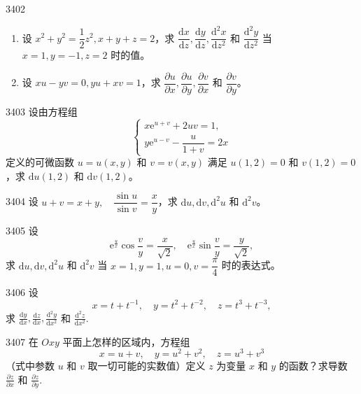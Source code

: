 \begin{prob}[M]{3402}
\begin{enumerate}[label=(\alph*), itemsep=2pt, topsep=3pt]
  \item 设 $x^2 + y^2 = \dfrac{1}{2}z^2, x + y + z = 2$，求 $\dfrac{\mathrm{d}x}{\mathrm{d}z}, \dfrac{\mathrm{d}y}{\mathrm{d}z}, \dfrac{\mathrm{d}^2 x}{\mathrm{d}z^2}$ 和 $\dfrac{\mathrm{d}^2 y}{\mathrm{d}z^2}$ 当 $x = 1, y = -1, z = 2$ 时的值。
  \item 设 $xu - yv = 0, yu + xv = 1$，求 $\dfrac{\partial u}{\partial x}, \dfrac{\partial u}{\partial y}, \dfrac{\partial v}{\partial x}$ 和 $\dfrac{\partial v}{\partial y}$。
\end{enumerate}
\end{prob}

\begin{prob}[M]{3403}
设由方程组
\[
\begin{cases}
x\mathrm{e}^{u + v} + 2uv = 1, \\
y\mathrm{e}^{u - v} - \dfrac{u}{1 + v} = 2x
\end{cases}
\]
定义的可微函数 $u = u(x, y)$ 和 $v = v(x, y)$ 满足 $u(1, 2) = 0$ 和 $v(1, 2) = 0$，求 $\mathrm{d}u(1, 2)$ 和 $\mathrm{d}v(1, 2)$。
\end{prob}

\begin{prob}[S]{3404}
设 $u + v = x + y,\quad \dfrac{\sin u}{\sin v} = \dfrac{x}{y}$，求 $\mathrm{d}u, \mathrm{d}v, \mathrm{d}^2 u$ 和 $\mathrm{d}^2 v$。
\end{prob}

\begin{prob}[M]{3405}
设
\[
\mathrm{e}^{\frac{u}{x}}\cos\frac{v}{y} = \frac{x}{\sqrt{2}}, \quad \mathrm{e}^{\frac{u}{x}}\sin\frac{v}{y} = \frac{y}{\sqrt{2}},
\]
求 $\mathrm{d}u, \mathrm{d}v, \mathrm{d}^2 u$ 和 $\mathrm{d}^2 v$ 当 $x = 1, y = 1, u = 0, v = \dfrac{\pi}{4}$ 时的表达式。
\end{prob}

\begin{prob}[M]{3406}
设
\[
x = t + t^{-1}, \quad y = t^2 + t^{-2}, \quad z = t^3 + t^{-3},
\]
求 $\frac{\mathrm{d}y}{\mathrm{d}x}, \frac{\mathrm{d}z}{\mathrm{d}x}, \frac{\mathrm{d}^2 y}{\mathrm{d}x^2}$ 和 $\frac{\mathrm{d}^2 z}{\mathrm{d}x^2}$.
\end{prob}

\begin{prob}[M]{3407}
在 $Oxy$ 平面上怎样的区域内，方程组
\[
x = u + v, \quad y = u^2 + v^2, \quad z = u^3 + v^3
\]
（式中参数 $u$ 和 $v$ 取一切可能的实数值）定义 $z$ 为变量 $x$ 和 $y$ 的函数？求导数 $\frac{\partial z}{\partial x}$ 和 $\frac{\partial z}{\partial y}$.
\end{prob}

